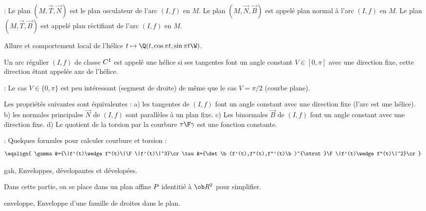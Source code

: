 \Remarque : Le plan $(M,\vec T,\vec N)$ est le plan osculateur de l'arc $(I,f)$ en $M$. \pn
Le plan $(M, \vec N,\vec B)$ est appelé plan normal à l'arc $(I,f)$ en $M$.\pn
Le plan $(M, \vec T,\vec B)$ est appelé plan réctifiant de l'arc $(I,f)$ en $M$. 

\centerline{%
}%
\Figure [Index=Courbes!Helice@Hélice] Allure et comportement local de l'hélice $t\mapsto \Q(t,\cos\pi t,\sin\pi t\W)$.

\Definition Un arc régulier $(I,f)$ de classe $\sc C^1$ est appelé une hélice 
si ses tangentes font un angle constant $V\in[0,\pi]$ avec une direction fixe, 
cette direction étant appelée axe de l'hélice. 
\bigskip

\Remarque : Le cas $V\in\{0,\pi\}$ est peu intéressant (segment de droite) 
de même que le cas $V=\pi/2$ (courbe plane). 
\bigskip

Les propriétés suivantes sont équivalentes : \pn 
a) les tangentes de $(I,f)$ font un angle constant avec une direction fixe (l'arc est une hélice). \pn
b) les normales principales $\vec N$ de $(I,f)$ sont parallèles à un plan fixe. \pn
c) Les binormales $\vec B$ de $(I,f)$ font un angle constant avec une direction fixe. \pn
d) Le quotient de la torsion par la courbure ${\tau\F \gamma}$ est une fonction constante. 
\bigskip

\Remarque : Quelques formules pour calculer courbure et torsion : 
$$
\eqalign{
\gamma&={\|f'(t)\wedge f''(t)\|\F \|f'(t)\|^3}\cr
\tau&={\det\b(f'(t),f''(t),f'''(t)\b)^{\strut}\F\|f'(t)\wedge f''(t)\|^2}\cr
}
$$





\Section gah, Enveloppes, dévelopantes et dévelopées. 
\bigskip

Dans cette partie, on se place dans un plan affine $\sc P$ 
identitié à $\ob R^2$ pour simplifier. 
\bigskip


\Subsection enveloppe, Enveloppe d'une famille de droites dans le plan. 

